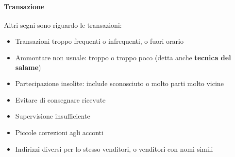 \paragraph*{Transazione}Altri segni sono riguardo le transazioni:
\begin{itemize}
  \item Transazioni troppo frequenti o infrequenti, o fuori orario
  \item Ammontare non usuale: troppo o troppo poco (detta anche
  \textbf{tecnica del salame})
  \item Partecipazione insolite: include sconosciuto o molto parti molto vicine
  \item Evitare di consegnare ricevute
  \item Supervisione insufficiente
  \item Piccole correzioni agli acconti
  \item Indirizzi diversi per lo stesso venditori, o venditori con nomi simili
\end{itemize}
